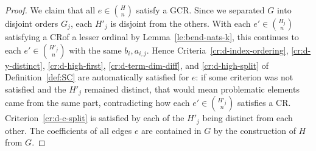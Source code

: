 \documentclass[10pt,a4paper]{article}
\newcommand{\crulenospace}{CR}
\newcommand{\gencrulenospace}{GCR}
\newcommand{\idegr}{j}
\theoremstyle{plain}
\theoremstyle{definition}
\begin{document}
\begin{proof}
We claim that all $e \in \binom{H}{n}$ satisfy a \gencrulenospace. Since we separated $G$ into disjoint orders $G_{\idegr}$, each $H'_{\idegr}$ is disjoint from the others.
With each $e' \in \binom{H_j}{n}$
satisfying a \crulenospace of a lesser ordinal by Lemma~\ref{le:bend-nats-k},
this continues to each $e' \in \binom{H'_j}{n}$ with the same $b_i, a_{i,j}$.
Hence
Criteria~\ref{cr:d-index-ordering}, \ref{cr:d-y-distinct}, \ref{cr:d-high-first},
\ref{cr:d-term-dim-diff}, and \ref{cr:d-high-split} of Definition~\ref{def:SC} are automatically satisfied for
$e$: if some
criterion was not satisfied and the $H'_{\idegr}$ remained distinct, that would
mean problematic elements came from the same part, contradicting how each $e' \in \binom{H'_j}{n}$
satisfies a \crulenospace.
Criterion~\ref{cr:d-c-split} is satisfied by each of the
$H'_{\idegr}$ being distinct from each other.
The coefficients of all edges $e$ are contained in $G$ by the construction of $H$ from $G$.
\end{proof}
\end{document}
